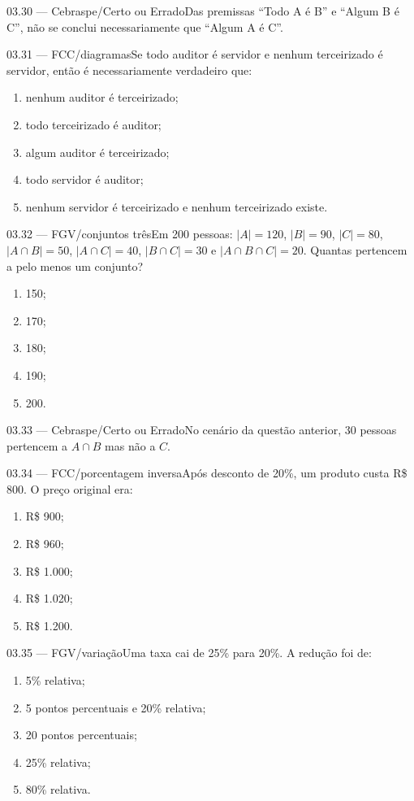 \begin{questao}{ 03.30 — Cebraspe/Certo ou Errado}Das premissas ``Todo A é B'' e ``Algum B é C'', não se conclui necessariamente que ``Algum A é C''.\end{questao}
\begin{questao}{ 03.31 — FCC/diagramas}Se todo auditor é servidor e nenhum terceirizado é servidor, então é necessariamente verdadeiro que:\begin{enumerate}[label=\Alph*)]\item nenhum auditor é terceirizado;\item todo terceirizado é auditor;\item algum auditor é terceirizado;\item todo servidor é auditor;\item nenhum servidor é terceirizado e nenhum terceirizado existe.\end{enumerate}\end{questao}
\begin{questao}{ 03.32 — FGV/conjuntos três}Em 200 pessoas: $|A|=120$, $|B|=90$, $|C|=80$, $|A\cap B|=50$, $|A\cap C|=40$, $|B\cap C|=30$ e $|A\cap B\cap C|=20$. Quantas pertencem a pelo menos um conjunto?\begin{enumerate}[label=\Alph*)]\item 150;\item 170;\item 180;\item 190;\item 200.\end{enumerate}\end{questao}
\begin{questao}{ 03.33 — Cebraspe/Certo ou Errado}No cenário da questão anterior, 30 pessoas pertencem a $A\cap B$ mas não a $C$.\end{questao}
\begin{questao}{ 03.34 — FCC/porcentagem inversa}Após desconto de 20\%, um produto custa R\$ 800. O preço original era:\begin{enumerate}[label=\Alph*)]\item R\$ 900;\item R\$ 960;\item R\$ 1.000;\item R\$ 1.020;\item R\$ 1.200.\end{enumerate}\end{questao}
\begin{questao}{ 03.35 — FGV/variação}Uma taxa cai de 25\% para 20\%. A redução foi de:\begin{enumerate}[label=\Alph*)]\item 5\% relativa;\item 5 pontos percentuais e 20\% relativa;\item 20 pontos percentuais;\item 25\% relativa;\item 80\% relativa.\end{enumerate}\end{questao}
